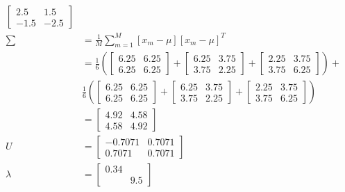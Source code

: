 \documentclass[fleqn]{article}
\begin{document}
\begin{description}
\begin{align*}
\begin{bmatrix}
                         2.5 &  1.5 \\
                        -1.5 & -2.5
                     \end{bmatrix} \\
        \sum &= \frac{1}{M} \sum_{m=1}^{M}{\left [ x_m - \mu \right ] \left [ x_m - \mu \right ]^T} \\
             &= \frac{1}{6} \left ( \begin{bmatrix} 6.25 & 6.25 \\ 6.25 & 6.25 \end{bmatrix} +
                \begin{bmatrix} 6.25 & 3.75 \\ 3.75 & 2.25 \end{bmatrix} +
                \begin{bmatrix} 2.25 & 3.75 \\ 3.75 & 6.25 \end{bmatrix} \right ) + \\
                    &\frac{1}{6} \left ( \begin{bmatrix} 6.25 & 6.25 \\ 6.25 & 6.25 \end{bmatrix} +
                \begin{bmatrix} 6.25 & 3.75 \\ 3.75 & 2.25 \end{bmatrix} +
                    \begin{bmatrix} 2.25 & 3.75 \\ 3.75 & 6.25 \end{bmatrix} \right ) \\
             &= \begin{bmatrix} 4.92 & 4.58 \\ 4.58 & 4.92 \end{bmatrix} \\
        U &= \begin{bmatrix} -0.7071 & 0.7071 \\ 0.7071 & 0.7071 \end{bmatrix} \\
        \lambda &= \begin{bmatrix} 0.34 & \\ & 9.5 \end{bmatrix} \\

\end{align*}
\end{description}
\end{document}
